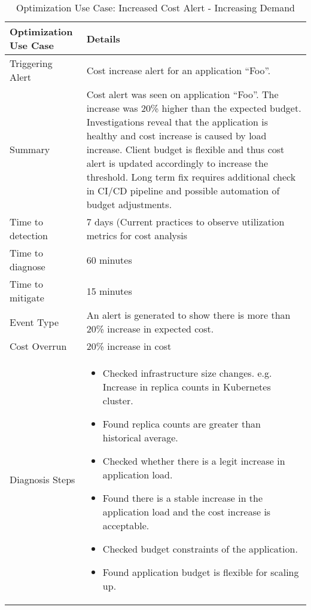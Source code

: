 \begin{table*}[ht!]
    \small
    \centering
    \begin{threeparttable}
        \caption{Optimization Use Case: Increased Cost Alert - Increasing Demand}
        \label{tab:optimization_use_case_demand}
        \begin{tabular}{m{}m{}}
            \toprule
            \textbf{Optimization Use Case} & \textbf{Details} \\
            \midrule
            Triggering Alert & Cost increase alert for an application “Foo”.  \\
            Summary & Cost alert was seen on application “Foo”. The increase was 20\% higher than the expected budget. Investigations reveal that the application is healthy and cost increase is caused by load increase. Client budget is flexible and thus cost alert is updated accordingly to increase the threshold. Long term fix requires additional check in CI/CD pipeline and possible automation of budget adjustments.   \\
            Time to detection & 7 days (Current practices to observe utilization metrics for cost analysis \\
            Time to diagnose & 60 minutes \\
            Time to mitigate & 15 minutes \\
            Event Type & An alert is generated to show there is more than 20\% increase in expected cost.\\
            Cost Overrun & 20\% increase in cost\\
            Diagnosis Steps & 
            \begin{itemize}[left=0pt, topsep=0pt, partopsep=0pt, itemsep=0pt, parsep=0pt]
                \item Checked infrastructure size changes. e.g. Increase in replica counts in Kubernetes cluster.
                \item Found replica counts are greater than historical average.
                \item Checked whether there is a legit increase in application load.
                \item Found there is a stable increase in the application load and the cost increase is acceptable.
                \item Checked budget constraints of the application.
                \item Found application budget is flexible for scaling up.

\end{itemize}
\end{tabular}
\end{threeparttable}
\end{table*}
